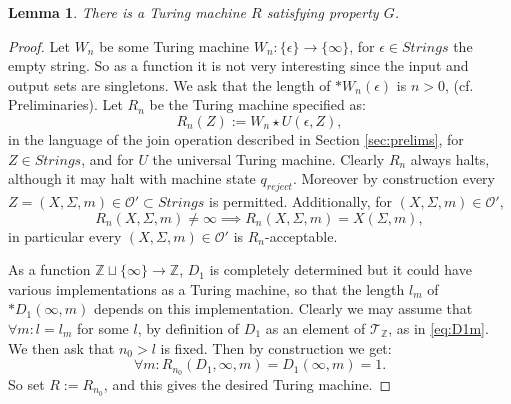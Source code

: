 \documentclass{amsart}  %
\numberwithin{equation}{section}
\newtheorem{lemma}[equation]{Lemma}
\theoremstyle{definition}
\theoremstyle{remark}
\begin{document}
{%
\begin{lemma} \label{lemma:computeWait} There is a Turing machine
$R$
satisfying property $G$. 
\end{lemma}
\begin{proof}
 Let $W _{n} $ be some Turing machine $W _{n} : \{\epsilon\} \to \{\infty\}$, for $\epsilon \in Strings$ the empty string. So as a function it is not very interesting since the input and output sets are singletons. We ask that the length of $*W _{n}  (\epsilon)$ is $n>0$, (cf. Preliminaries).  
Let $R _{n} $ be the Turing machine specified as:
  \begin{equation*}
   R _{n}  (Z):=   W _{n}   \star U (\epsilon, Z),
\end{equation*}
   in the language of the join operation described in Section \ref{sec:prelims}, for $Z \in Strings$, and for $U$ the universal Turing machine. Clearly $R _{n} $ always halts,  although it may halt with machine state $q _{reject} $. Moreover by construction every $Z = (X, \Sigma,m) \in \mathcal{O}' \subset Strings$ is permitted.
Additionally, for $ (X, \Sigma,m) \in \mathcal{O}'$, $$R _{n}  (X, \Sigma,m) \neq \infty \implies R _{n}  (X,\Sigma,m ) = X (\Sigma,m), $$ in particular every $(X,\Sigma, m) \in \mathcal{O}'$ is $R _{n} $-acceptable.  

   As a function $\mathbb{Z} \sqcup \{\infty\}   \to \mathbb{Z}$, $D _{1} $ is completely determined but it could have various implementations as a Turing machine,  so that the length $l _{m}  $  of $*D _{1} (\infty,m) $ depends on this implementation.
Clearly we may assume that $ \forall m: l=l _{m}   $ for some $l$, by definition of $D _{1} $ as an element of $\mathcal{T} _{\mathbb{Z}} $, as in \eqref{eq:D1m}.
   We  then ask that $n _{0}  > l$ is fixed. Then by construction we get: $$\forall m: R _{n _{0} } (D_1 , \infty,m)= D_1 (\infty,m)=1.  $$  So set $R:= R _{n _{0} }$, and this gives the desired Turing machine. 


\end{proof}}
\end{document}
